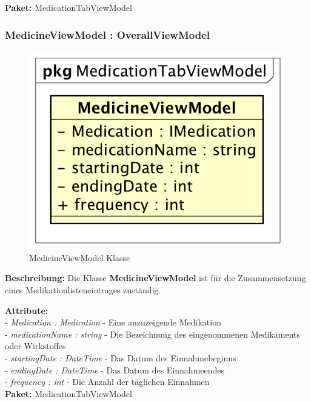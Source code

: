 \documentclass[a4paper]{scrreprt}
\begin{document}
\textbf{Paket:} MedicationTabViewModel

\subsubsection{MedicineViewModel : OverallViewModel}
\begin{figure}[H]
\centering
\includegraphics[width=0.45\textheight]{graphics/Klassendiagramme/ViewModel/MedicineViewModel.png}
\caption{MedicineViewModel Klasse}
\end{figure}

\textbf{Beschreibung:} Die Klasse \textbf{MedicineViewModel} ist für die Zusammensetzung eines Medikationlisteneintrages zuständig.

\textbf{Attribute:}\\
- \textit{Medication : Medication} - Eine anzuzeigende Medikation\\
- \textit{medicationName : string} - Die Bezeichnung des eingenommenen Medikaments oder Wirkstoffes\\
- \textit{startingDate : DateTime} - Das Datum des Einnahmebeginns\\
- \textit{endingDate : DateTime} - Das Datum des Einnahmeendes\\
- \textit{frequency : int} - Die Anzahl der täglichen Einnahmen\\

\textbf{Paket:} MedicationTabViewModel
\end{document}
